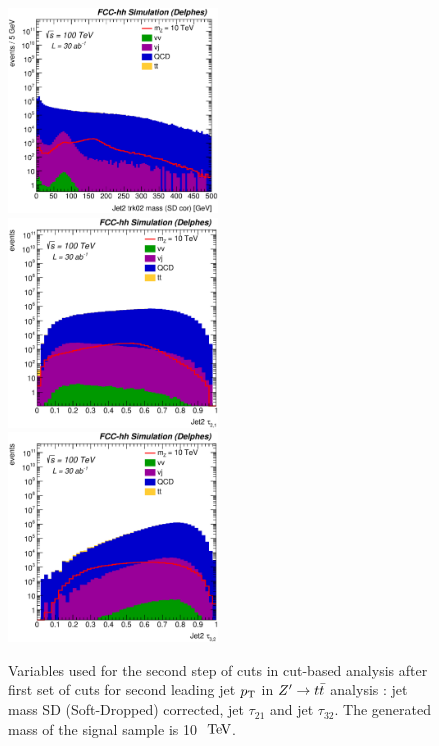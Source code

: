 \documentclass{cernrep}
\begin{document}
\begin{figure}[!htb]\centering
\includegraphics[width=0.495\textwidth]{Fig/Zptt/Jet2_trk02_SD_Cor_m_sel1_nostack_log.eps}
\includegraphics[width=0.495\textwidth]{Fig/Zptt/Jet2_tau21_sel1_nostack_log.eps}
\includegraphics[width=0.495\textwidth]{Fig/Zptt/Jet2_tau32_sel1_nostack_log.eps}
\caption{Variables used for the second step of cuts in cut-based analysis after first set of cuts for second leading jet $p\sb{\scriptstyle\mathrm{T}}$ in $Z^{\prime} \rightarrow t\bar{t}$ analysis : jet mass SD (Soft-Dropped) corrected, jet $\tau_{21}$ and jet $\tau_{32}$. The generated mass of the signal sample is 10 $\TeV$.}
\label{fig:Zptt_sel1_cut}
\end{figure}
\end{document}
